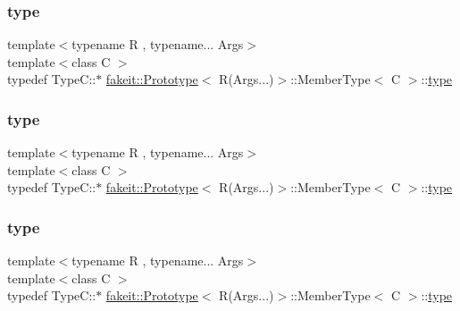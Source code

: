 \subsubsection{\texorpdfstring{type}{type}\hspace{0.1cm}{\footnotesize\ttfamily [7/9]}}
{\footnotesize\ttfamily template$<$typename R , typename... Args$>$ \\
template$<$class C $>$ \\
typedef Type\+C\+::$\ast$ \mbox{\hyperlink{structfakeit_1_1Prototype}{fakeit\+::\+Prototype}}$<$ R(Args...)$>$\+::Member\+Type$<$ C $>$\+::\mbox{\hyperlink{structfakeit_1_1Prototype_3_01R_07Args_8_8_8_08_4_1_1MemberType_a83b41bd489e085916700f036470cc383}{type}}}

\mbox{\label{structfakeit_1_1Prototype_3_01R_07Args_8_8_8_08_4_1_1MemberType_a83b41bd489e085916700f036470cc383}} 
\subsubsection{\texorpdfstring{type}{type}\hspace{0.1cm}{\footnotesize\ttfamily [8/9]}}
{\footnotesize\ttfamily template$<$typename R , typename... Args$>$ \\
template$<$class C $>$ \\
typedef Type\+C\+::$\ast$ \mbox{\hyperlink{structfakeit_1_1Prototype}{fakeit\+::\+Prototype}}$<$ R(Args...)$>$\+::Member\+Type$<$ C $>$\+::\mbox{\hyperlink{structfakeit_1_1Prototype_3_01R_07Args_8_8_8_08_4_1_1MemberType_a83b41bd489e085916700f036470cc383}{type}}}

\mbox{\label{structfakeit_1_1Prototype_3_01R_07Args_8_8_8_08_4_1_1MemberType_a83b41bd489e085916700f036470cc383}} 
\subsubsection{\texorpdfstring{type}{type}\hspace{0.1cm}{\footnotesize\ttfamily [9/9]}}
{\footnotesize\ttfamily template$<$typename R , typename... Args$>$ \\
template$<$class C $>$ \\
typedef Type\+C\+::$\ast$ \mbox{\hyperlink{structfakeit_1_1Prototype}{fakeit\+::\+Prototype}}$<$ R(Args...)$>$\+::Member\+Type$<$ C $>$\+::\mbox{\hyperlink{structfakeit_1_1Prototype_3_01R_07Args_8_8_8_08_4_1_1MemberType_a83b41bd489e085916700f036470cc383}{type}}}




